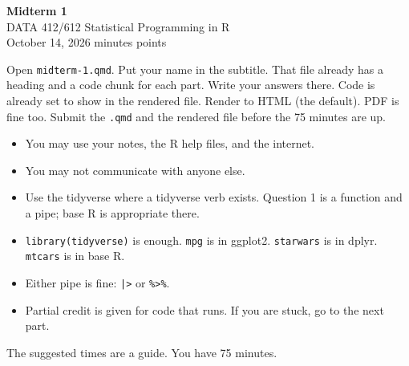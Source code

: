 \documentclass[11pt]{article}
\begin{document}
\begin{center}
{\LARGE\bfseries Midterm 1}\\[0.3em]
DATA 412/612 \quad Statistical Programming in R\\[0.15em]
October 14, 2026  minutes  points
\end{center}

Open \texttt{midterm-1.qmd}. Put your name in the subtitle.
That file already has a heading and a code chunk for each part. Write your answers there.
Code is already set to show in the rendered file.
Render to HTML (the default). PDF is fine too. Submit the \texttt{.qmd} and the rendered file before the 75 minutes are up.

\begin{itemize}
  \item You may use your notes, the R help files, and the internet.
  \item You may not communicate with anyone else.
  \item Use the tidyverse where a tidyverse verb exists. Question 1 is a function and a pipe; base R is appropriate there.
  \item \texttt{library(tidyverse)} is enough. \texttt{mpg} is in ggplot2. \texttt{starwars} is in dplyr. \texttt{mtcars} is in base R.
  \item Either pipe is fine: \texttt{|>} or \texttt{\%>\%}.
  \item Partial credit is given for code that runs. If you are stuck, go to the next part.
\end{itemize}

The suggested times are a guide. You have 75 minutes.
\end{document}
